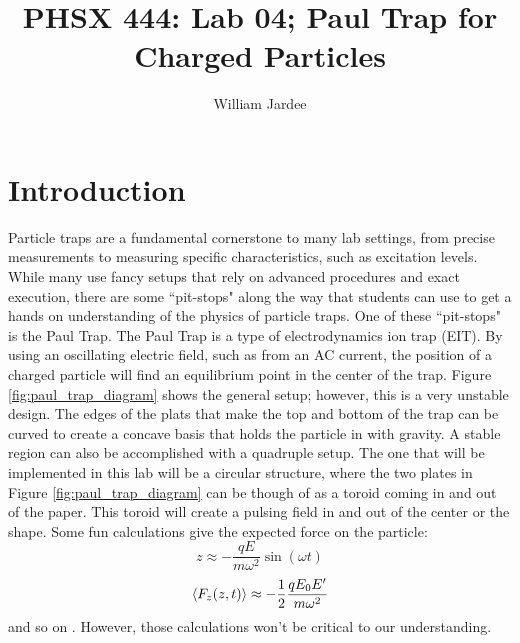 \documentclass[12pt]{article}
\begin{document}
\title{PHSX 444: Lab 04; Paul Trap for Charged Particles}
\author{William Jardee}
\maketitle


\section{Introduction}

Particle traps are a fundamental cornerstone to many lab settings, from precise measurements to measuring specific characteristics, such as excitation levels. While many use fancy setups that rely on advanced procedures and exact execution, there are some ``pit-stops" along the way that students can use to get a hands on understanding of the physics of particle traps. One of these ``pit-stops" is the Paul Trap. The Paul Trap is a type of electrodynamics ion trap (EIT). By using an oscillating electric field, such as from an AC current, the position of a charged particle will find an equilibrium point in the center of the trap. Figure \ref{fig:paul_trap_diagram} shows the general setup; however, this is a very unstable design. The edges of the plats that make the top and bottom of the trap can be curved to create a concave basis that holds the particle in with gravity. A stable region can also be accomplished with a quadruple setup. The one that will be implemented in this lab will be a circular structure, where the two plates in Figure \ref{fig:paul_trap_diagram} can be though of as a toroid coming in and out of the paper. This toroid will create a pulsing field in and out of the center or the shape. Some fun calculations give the expected force on the particle:
\begin{equation*}
z \approx -\frac{q E}{m \omega^2}\sin(\omega t)
\end{equation*}
\begin{equation*}
\ev{F_z(z,t)} \approx -\frac{1}{2} \frac{qE_0 E^\prime}{m \omega^2}
\end{equation*}
and so on \cite{libbrecht_black_2018}. However, those calculations won't be critical to our understanding. 
\end{document}
